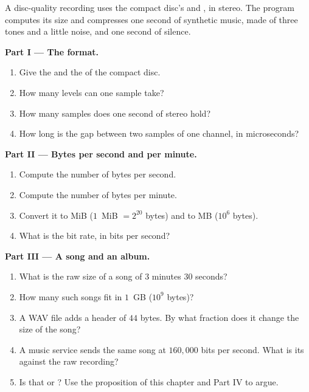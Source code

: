 \begin{problem}\label{pb:g10:images-sound-compression:1}
A disc-quality recording uses the compact disc's  and , in stereo. The program
 computes its size and compresses one second of synthetic music, made of three
tones and a little noise, and one second of silence.

\medskip\noindent\textbf{Part I --- The format.}
\begin{enumerate}
  \item Give the  and the  of the compact disc.
  \item How many levels can one sample take?
  \item How many samples does one second of stereo hold?
  \item How long is the gap between two samples of one channel, in microseconds?
\end{enumerate}

\medskip\noindent\textbf{Part II --- Bytes per second and per minute.}
\begin{enumerate}[resume]
  \item Compute the number of bytes per second.
  \item Compute the number of bytes per minute.
  \item Convert it to MiB ($1$~MiB $= 2^{20}$ bytes) and to MB ($10^6$ bytes).
  \item What is the bit rate, in bits per second?
\end{enumerate}

\medskip\noindent\textbf{Part III --- A song and an album.}
\begin{enumerate}[resume]
  \item What is the raw size of a song of $3$ minutes $30$ seconds?
  \item How many such songs fit in $1$~GB ($10^9$ bytes)?
  \item A WAV file adds a header of $44$ bytes. By what fraction does it change the size of the song?
  \item A music service sends the same song at $160{,}000$ bits per second. What is its  against the
    raw recording?
  \item Is that   or ? Use the proposition of this chapter and Part IV to argue.
\end{enumerate}


\end{problem}
